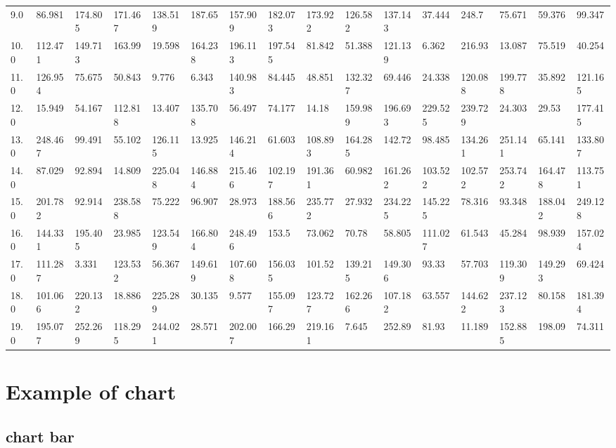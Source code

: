 \documentclass[reprint, floatfix, groupaddress, prb]{article}
\begin{document}
\begin{table}[ht]
{\begin{tabular}[l]{llllllllllllllll}
9.0 & 86.981 & 174.805 & 171.467 & 138.519 & 187.65 & 157.909 & 182.073 & 173.922 & 126.582 & 137.143 & 37.444 & 248.7 & 75.671 & 59.376 & 99.347\\ 
10.0 & 112.471 & 149.713 & 163.99 & 19.598 & 164.238 & 196.113 & 197.545 & 81.842 & 51.388 & 121.139 & 6.362 & 216.93 & 13.087 & 75.519 & 40.254\\ 
11.0 & 126.954 & 75.675 & 50.843 & 9.776 & 6.343 & 140.983 & 84.445 & 48.851 & 132.327 & 69.446 & 24.338 & 120.088 & 199.778 & 35.892 & 121.165\\ 
12.0 & 15.949 & 54.167 & 112.818 & 13.407 & 135.708 & 56.497 & 74.177 & 14.18 & 159.989 & 196.693 & 229.525 & 239.729 & 24.303 & 29.53 & 177.415\\ 
13.0 & 248.467 & 99.491 & 55.102 & 126.115 & 13.925 & 146.214 & 61.603 & 108.893 & 164.285 & 142.72 & 98.485 & 134.261 & 251.141 & 65.141 & 133.807\\ 
14.0 & 87.029 & 92.894 & 14.809 & 225.048 & 146.884 & 215.466 & 102.197 & 191.361 & 60.982 & 161.262 & 103.522 & 102.572 & 253.742 & 164.478 & 113.751\\ 
15.0 & 201.782 & 92.914 & 238.588 & 75.222 & 96.907 & 28.973 & 188.566 & 235.772 & 27.932 & 234.225 & 145.225 & 78.316 & 93.348 & 188.042 & 249.128\\ 
16.0 & 144.331 & 195.405 & 23.985 & 123.549 & 166.804 & 248.496 & 153.5 & 73.062 & 70.78 & 58.805 & 111.027 & 61.543 & 45.284 & 98.939 & 157.024\\ 
17.0 & 111.287 & 3.331 & 123.532 & 56.367 & 149.619 & 107.608 & 156.035 & 101.52 & 139.215 & 149.306 & 93.33 & 57.703 & 119.309 & 149.293 & 69.424\\ 
18.0 & 101.066 & 220.132 & 18.886 & 225.289 & 30.135 & 9.577 & 155.097 & 123.727 & 162.266 & 107.182 & 63.557 & 144.622 & 237.123 & 80.158 & 181.394\\ 
19.0 & 195.077 & 252.269 & 118.295 & 244.021 & 28.571 & 202.007 & 166.29 & 219.161 & 7.645 & 252.89 & 81.93 & 11.189 & 152.885 & 198.09 & 74.311\\ 
\bottomrule 
 \end{tabular}
}\end{table}

    

    \hypertarget{example-of-chart}{%
\section{Example of chart}\label{example-of-chart}}

    \hypertarget{chart-bar}{%
\subsection{chart bar}\label{chart-bar}}
\end{document}
